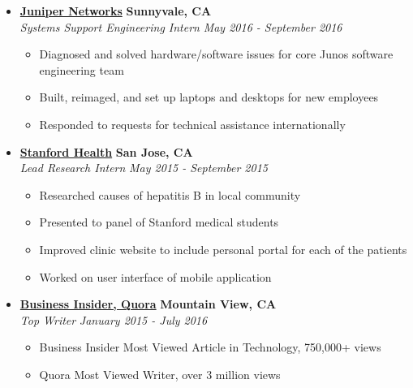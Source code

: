 \documentclass[10pt,letterpaper]{article}
\begin{document}
\begin{itemize}
    \item[]
    {\href{http://www.twitter.com}{\textbf{Juniper Networks}} \hfill
      \textbf{Sunnyvale, CA}}
    \\
    {\emph{Systems Support Engineering Intern} \hfill \emph{May 2016 - September 2016}}

    \begin{itemize}[label=\textbullet]
      \itemsep0em
      \item Diagnosed and solved hardware/software issues for core Junos software engineering team
      \item Built, reimaged, and set up laptops and desktops for new employees
      \item Responded to requests for technical assistance internationally
    \end{itemize}

    \item[]
    {\href{http://www.disqus.com}{\textbf{Stanford Health}} \hfill
      \textbf{San Jose, CA}}
    \\
    {\emph{Lead Research Intern} \hfill \emph{May 2015 - September 2015}}

    \begin{itemize}[label=\textbullet]
      \itemsep0em
      \item Researched causes of hepatitis B in local community
      \item Presented to panel of Stanford medical students
      \item Improved clinic website to include personal portal for each of the patients
      \item Worked on user interface of mobile application
    \end{itemize}


    \item[]
    {\href{http://www.twg.ca}{\textbf{Business Insider, Quora}} \hfill
      \textbf{Mountain View, CA}}
    \\
    {\emph{Top Writer} \hfill \emph{January 2015 - July 2016}}

    \begin{itemize}[label=\textbullet]
      \itemsep0em
      \item Business Insider Most Viewed Article in Technology, 750,000+ views
      \item Quora Most Viewed Writer, over 3 million views
    \end{itemize}
  \end{itemize}
\end{document}
